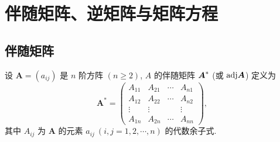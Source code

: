 \section{伴随矩阵、逆矩阵与矩阵方程}

\subsection{伴随矩阵}

\begin{definition}[伴随矩阵的定义]
    设 $ \boldsymbol{A}=\left(a_{i j}\right) $ 是 $ n $ 阶方阵 $ (n \geqslant 2)$, $A $ 的伴随矩阵 $\vb*{A}^*$ (或 $\mathrm{adj}\vb*{A}$) 定义为
    $$\boldsymbol{A}^{*}=\begin{pmatrix}
            A_{11}  & A_{21}  & \cdots & A_{n 1} \\
            A_{12}  & A_{22}  & \cdots & A_{n 2} \\
            \vdots  & \vdots  &        & \vdots  \\
            A_{1 n} & A_{2 n} & \cdots & A_{n n}
        \end{pmatrix},$$
    其中 $ A_{i j} $ 为 $ \boldsymbol{A} $ 的元素 $ a_{i j}~ (i, j=1,2, \cdots, n) $ 的代数余子式.
\end{definition}

